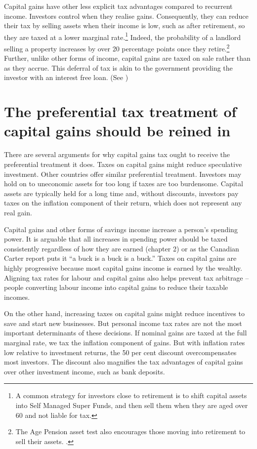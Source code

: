 \documentclass{grattan}\usepackage[]{graphicx}\usepackage[]{color}
\begin{document}
Capital gains have other less explicit tax advantages compared to recurrent income. Investors control when they realise gains. Consequently, they can reduce their tax by selling assets when their income is low, such as after retirement, so they are taxed at a lower marginal rate.\footnote{A common strategy for investors close to retirement is to shift capital assets into Self Managed Super Funds, and then sell them when they are aged over 60 and not liable for tax.}  Indeed, the probability of a landlord selling a property increases by over 20 percentage points once they retire.\footnote{The Age Pension asset test also encourages those moving into retirement to sell their assets. \textcite{Wood2010a}.}
Further, unlike other forms of income, capital gains are taxed on sale rather than as they accrue. This deferral of tax is akin to the government providing the investor with an interest free loan. (See )

\section{The preferential tax treatment of capital gains should be reined in}\label{sec:ShouldCapitalGainsBeTaxedConsistently}
There are several arguments for why capital gains tax ought to receive the preferential treatment it does. Taxes on capital gains might reduce speculative investment. Other countries offer similar preferential treatment. Investors may hold on to uneconomic assets for too long if taxes are too burdensome. Capital assets are typically held for a long time and, without discounts, investors pay taxes on the inflation component of their return, which does not represent any real gain. 

Capital gains and other forms of savings income increase a person's spending power. It is arguable that all increases in spending power should be taxed consistently regardless of how they are earned (chapter 2) or as the Canadian Carter report puts it ``a buck is a buck is a buck.''  Taxes on capital gains are highly progressive because most capital gains income is earned by the wealthy. Aligning tax rates for labour and capital gains also helps prevent tax arbitrage -- people converting labour income into capital gains to reduce their taxable incomes. 

On the other hand, increasing taxes on capital gains might reduce incentives to save and start new businesses. But personal income tax rates are not the most important determinants of these decisions. If nominal gains are taxed at the full marginal rate, we tax the inflation component of gains.  But with inflation rates low relative to investment returns, the 50 per cent discount overcompensates most investors. The discount also magnifies the tax advantages of capital gains over other investment income, such as bank deposits.
\end{document}
